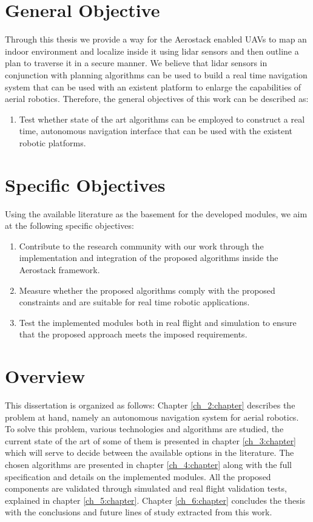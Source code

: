   \section{General Objective}

    Through this thesis we provide a way for the Aerostack enabled UAVs to map an indoor environment and localize inside it using lidar sensors and then outline a plan to traverse it in a secure manner. We believe that lidar sensors in conjunction with planning algorithms can be used to build a real time navigation system that can be used with an existent platform to enlarge the capabilities of aerial robotics. Therefore, the general objectives of this work can be described as:

    \begin{enumerate}
      \item Test whether state of the art algorithms can be employed to construct a real time, autonomous navigation interface that can be used with the existent robotic platforms.
    \end{enumerate}

  \section{Specific Objectives}

    Using the available literature as the basement for the developed modules, we aim at the following specific objectives:

    \begin{enumerate}
      \item Contribute to the research community with our work through the implementation and integration of the proposed algorithms inside the Aerostack framework.
      \item Measure whether the proposed algorithms comply with the proposed constraints and are suitable for real time robotic applications.
      \item Test the implemented modules both in real flight and simulation to ensure that the proposed approach meets the imposed requirements.
    \end{enumerate}

  \section{Overview}

    This dissertation is organized as follows: Chapter \ref{ch_2:chapter} describes the problem at hand, namely an autonomous navigation system for aerial robotics. To solve this problem, various technologies and algorithms are studied, the current state of the art of some of them is presented in chapter \ref{ch_3:chapter} which will serve to decide between the available options in the literature. The chosen algorithms are presented in chapter \ref{ch_4:chapter} along with the full specification and details on the implemented modules. All the proposed components are validated through simulated and real flight validation tests, explained in chapter \ref{ch_5:chapter}. Chapter \ref{ch_6:chapter} concludes the thesis with the conclusions and future lines of study extracted from this work.

